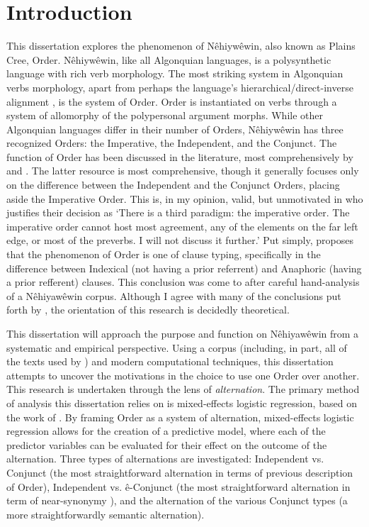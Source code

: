 \chapter{Introduction}
\label{ch:intro}

This dissertation explores the phenomenon of Nêhiywêwin, also known as Plains Cree, Order. Nêhiywêwin, like all Algonquian languages, is a polysynthetic language with rich verb morphology. The most striking system in Algonquian verbs morphology, apart from perhaps the language's hierarchical/direct-inverse alignment \citep[53]{Wolvengrey2011}, is the system of Order. Order is instantiated on verbs through a system of allomorphy of the polypersonal argument morphs. While other Algonquian languages differ in their number of Orders, Nêhiywêwin has three recognized Orders: the Imperative, the Independent, and the Conjunct. The function of Order has been discussed in the literature, most comprehensively by \citet{Wolfart1973} and \citet{Cook2014}. The latter resource is most comprehensive, though it generally focuses only on the difference between the Independent and the Conjunct Orders, placing aside the Imperative Order. This is, in my opinion, valid, but unmotivated in \cite[11]{Cook2014} who justifies their decision as `There is a third paradigm: the imperative order. The imperative order cannot host most agreement, any of the elements on the far left edge, or most of the preverbs. I will not discuss it further.' Put simply, \citet{Cook2014} proposes that the phenomenon of Order is one of clause typing, specifically in the difference between Indexical (not having a prior referrent) and Anaphoric (having a prior refferent) clauses. This conclusion was come to after careful hand-analysis of a Nêhiyawêwin corpus. Although I agree with many of the conclusions put forth by \citet{Cook2014}, the orientation of this research is decidedly theoretical. 

This dissertation will approach the purpose and function on Nêhiyawêwin from a systematic and empirical perspective. Using a corpus (including, in part, all of the texts used by \citet{Cook2014}) and modern computational techniques, this dissertation attempts to uncover the motivations in the choice to use one Order over another. This research is undertaken through the lens of \textit{alternation}. The primary method of analysis this dissertation relies on is mixed-effects logistic regression, based on the work of \citet{arppe2008univariate}. By framing Order as a system of alternation, mixed-effects logistic regression allows for the creation of a predictive model, where each of the predictor variables can be evaluated for their effect on the outcome of the alternation. Three types of alternations are investigated: Independent vs. Conjunct (the most straightforward alternation in terms of previous description of Order), Independent vs. ê-Conjunct (the most straightforward alternation in term of near-synonymy \citep[157-159]{cruse2001}), and the alternation of the various Conjunct types (a more straightforwardly semantic alternation).

